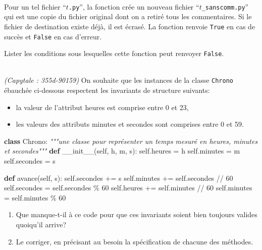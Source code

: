 \documentclass[a4paper,17pt]{extarticle}
\newenvironment{eleve}%
{\begin{activite}\color{noiramu}\\[-0.5cm]}
{\end{activite}}
\providecommand{\tightlist}{%
      \setlength{\itemsep}{0pt}\setlength{\parskip}{0pt}}
\newenvironment{Shaded}{}{}
\newcommand{\KeywordTok}[1]{\textcolor[rgb]{0.00,0.44,0.13}{\textbf{{#1}}}}
\newcommand{\DecValTok}[1]{\textcolor[rgb]{0.25,0.63,0.44}{{#1}}}
\newcommand{\CommentTok}[1]{\textcolor[rgb]{0.38,0.63,0.69}{\textit{{#1}}}}
\newcommand{\FunctionTok}[1]{\textcolor[rgb]{0.02,0.16,0.49}{{#1}}}
\newcommand{\NormalTok}[1]{{#1}}
\newcommand{\VariableTok}[1]{\textcolor[rgb]{0.10,0.09,0.49}{{#1}}}
\newcommand{\OperatorTok}[1]{\textcolor[rgb]{0.40,0.40,0.40}{{#1}}}
\begin{document}
\begin{eleve}
Pour un tel fichier ``\(t\)\texttt{.py}'', la fonction crée un nouveau
fichier ``\(t\)\texttt{\_sanscomm.py}'' qui est une copie du fichier
original dont on a retiré tous les commentaires. Si le fichier de
destination existe déjà, il est écrasé. La fonction renvoie
\texttt{True} en cas de succès et \texttt{False} en cas d'erreur.

Lister les conditions sous lesquelles cette fonction peut renvoyer
\texttt{False}.
        
        \end{eleve}\begin{eleve}
    \emph{(Capytale : 355d-90159)} On souhaite que les instances de la
classe \texttt{Chrono} ébauchée ci-dessous respectent les invariants de
structure suivants:

\begin{itemize}
\tightlist
\item
  la valeur de l'attribut heures est comprise entre 0 et 23,
\item
  les valeurs des attributs minutes et secondes sont comprises entre 0
  et 59.
\end{itemize}

\begin{Shaded}
\begin{Highlighting}[]
\KeywordTok{class}\NormalTok{ Chrono:}
    \CommentTok{"""une classe pour représenter un temps }
\CommentTok{    mesuré en heures, minutes et secondes"""}
    \KeywordTok{def} \FunctionTok{\_\_init\_\_}\NormalTok{(}\VariableTok{self}\NormalTok{, h, m, s):}
        \VariableTok{self}\NormalTok{.heures   }\OperatorTok{=}\NormalTok{ h}
        \VariableTok{self}\NormalTok{.minutes  }\OperatorTok{=}\NormalTok{ m}
        \VariableTok{self}\NormalTok{.secondes }\OperatorTok{=}\NormalTok{ s}
    
    \KeywordTok{def}\NormalTok{ avance(}\VariableTok{self}\NormalTok{, s):}
        \VariableTok{self}\NormalTok{.secondes }\OperatorTok{+=}\NormalTok{ s}
        \VariableTok{self}\NormalTok{.minutes  }\OperatorTok{+=} \VariableTok{self}\NormalTok{.secondes }\OperatorTok{//} \DecValTok{60}
        \VariableTok{self}\NormalTok{.secondes  }\OperatorTok{=} \VariableTok{self}\NormalTok{.secondes }\OperatorTok{\%}  \DecValTok{60}
        \VariableTok{self}\NormalTok{.heures   }\OperatorTok{+=} \VariableTok{self}\NormalTok{.minutes  }\OperatorTok{//} \DecValTok{60}
        \VariableTok{self}\NormalTok{.minutes   }\OperatorTok{=} \VariableTok{self}\NormalTok{.minutes  }\OperatorTok{\%}  \DecValTok{60}
\end{Highlighting}
\end{Shaded}

\begin{enumerate}
\def\labelenumi{\arabic{enumi}.}
\tightlist
\item
  Que manque-t-il à ce code pour que ces invariants soient bien toujours
  valides quoiqu'il arrive?
\item
  Le corriger, en précisant au besoin la spécification de chacune des
  méthodes.
\end{enumerate}
        
        \end{eleve}

    
    
    
\end{document}
